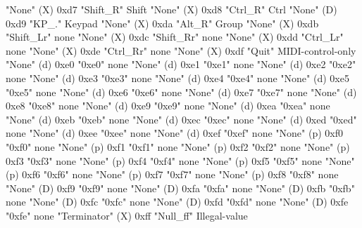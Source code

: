 "None"        (X)    0xd7    "Shift_R"     Shift
"None"        (X)    0xd8    "Ctrl_R"      Ctrl
"None"        (D)    0xd9    "KP_."        Keypad
"None"        (X)    0xda    "Alt_R"       Group
"None"        (X)    0xdb    "Shift_Lr"    none
"None"        (X)    0xdc    "Shift_Rr"    none
"None"        (X)    0xdd    "Ctrl_Lr"     none
"None"        (X)    0xde    "Ctrl_Rr"     none
"None"        (X)    0xdf    "Quit"        MIDI-control-only
"None"        (d)    0xe0    "0xe0"        none
"None"        (d)    0xe1    "0xe1"        none
"None"        (d)    0xe2    "0xe2"        none
"None"        (d)    0xe3    "0xe3"        none
"None"        (d)    0xe4    "0xe4"        none
"None"        (d)    0xe5    "0xe5"        none
"None"        (d)    0xe6    "0xe6"        none
"None"        (d)    0xe7    "0xe7"        none
"None"        (d)    0xe8    "0xe8"        none
"None"        (d)    0xe9    "0xe9"        none
"None"        (d)    0xea    "0xea"        none
"None"        (d)    0xeb    "0xeb"        none
"None"        (d)    0xec    "0xec"        none
"None"        (d)    0xed    "0xed"        none
"None"        (d)    0xee    "0xee"        none
"None"        (d)    0xef    "0xef"        none
"None"        (p)    0xf0    "0xf0"        none
"None"        (p)    0xf1    "0xf1"        none
"None"        (p)    0xf2    "0xf2"        none
"None"        (p)    0xf3    "0xf3"        none
"None"        (p)    0xf4    "0xf4"        none
"None"        (p)    0xf5    "0xf5"        none
"None"        (p)    0xf6    "0xf6"        none
"None"        (p)    0xf7    "0xf7"        none
"None"        (p)    0xf8    "0xf8"        none
"None"        (D)    0xf9    "0xf9"        none
"None"        (D)    0xfa    "0xfa"        none
"None"        (D)    0xfb    "0xfb"        none
"None"        (D)    0xfc    "0xfc"        none
"None"        (D)    0xfd    "0xfd"        none
"None"        (D)    0xfe    "0xfe"        none
"Terminator"  (X)    0xff    "Null_ff"     Illegal-value


